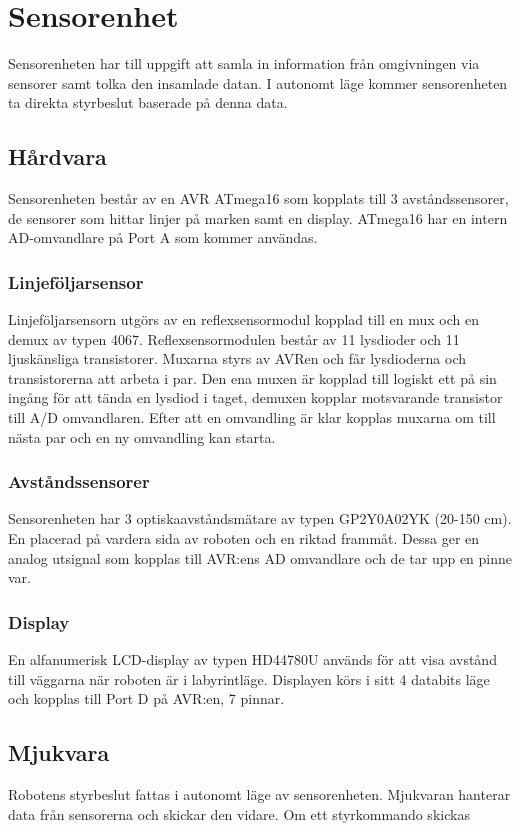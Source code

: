 \section{Sensorenhet}
Sensorenheten har till uppgift att samla in information från omgivningen via sensorer samt tolka den insamlade datan. I autonomt läge kommer sensorenheten ta direkta styrbeslut baserade på denna data. 

\subsection{Hårdvara}
Sensorenheten består av en AVR ATmega16 som kopplats till 3 avståndssensorer, de sensorer som hittar linjer på marken samt en display. ATmega16 har en intern AD-omvandlare på Port A som kommer användas.

\subsubsection{Linjeföljarsensor}
Linjeföljarsensorn utgörs av en reflexsensormodul kopplad till en mux och en demux av typen 4067. Reflexsensormodulen består av 11 lysdioder och 11 ljuskänsliga transistorer.  Muxarna styrs av AVRen och får lysdioderna och transistorerna att arbeta i par. Den ena muxen är kopplad till logiskt ett på sin ingång för att tända en lysdiod i taget, demuxen kopplar motsvarande transistor till A/D omvandlaren. Efter att en omvandling är klar kopplas muxarna om till nästa par och en ny omvandling kan starta.

\subsubsection{Avståndssensorer}
Sensorenheten har 3 optiskaavståndsmätare av typen GP2Y0A02YK (20-150 cm). En placerad på vardera sida av roboten och en riktad frammåt. Dessa ger en analog utsignal som kopplas till AVR:ens AD omvandlare och de tar upp en pinne var.

\subsubsection{Display}
En alfanumerisk LCD-display av typen HD44780U används för att visa avstånd till väggarna när roboten är i labyrintläge. Displayen körs i sitt 4 databits läge och kopplas till Port D på AVR:en, 7 pinnar.


\subsection{Mjukvara}
Robotens styrbeslut fattas i autonomt läge av sensorenheten. Mjukvaran hanterar data från sensorerna och skickar den vidare. Om ett styrkommando skickas 

